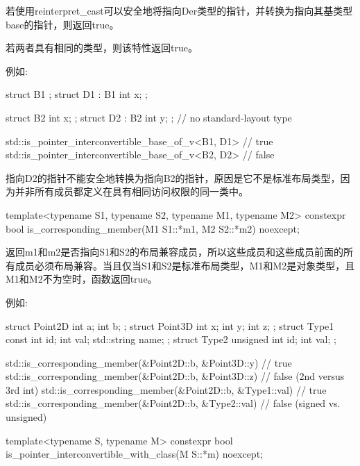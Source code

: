 
若使用reinterpret\_cast可以安全地将指向Der类型的指针，并转换为指向其基类型base的指针，则返回true。

若两者具有相同的类型，则该特性返回true。

例如:

\begin{cpp}
struct B1 { };
struct D1 : B1 { int x; };

struct B2 { int x; };
struct D2 : B2 { int y; }; // no standard-layout type

std::is_pointer_interconvertible_base_of_v<B1, D1> // true
std::is_pointer_interconvertible_base_of_v<B2, D2> // false
\end{cpp}

指向D2的指针不能安全地转换为指向B2的指针，原因是它不是标准布局类型，因为并非所有成员都定义在具有相同访问权限的同一类中。


\begin{cpp}
template<typename S1, typename S2, typename M1, typename M2>
constexpr bool is_corresponding_member(M1 S1::*m1, M2 S2::*m2) noexcept;
\end{cpp}

返回m1和m2是否指向S1和S2的布局兼容成员，所以这些成员和这些成员前面的所有成员必须布局兼容。当且仅当S1和S2是标准布局类型，M1和M2是对象类型，且M1和M2不为空时，函数返回true。

例如:

\begin{cpp}
struct Point2D { int a; int b; };
struct Point3D { int x; int y; int z; };
struct Type1 { const int id; int val; std::string name; };
struct Type2 { unsigned int id; int val; };

std::is_corresponding_member(&Point2D::b, &Point3D::y) // true
std::is_corresponding_member(&Point2D::b, &Point3D::z) // false (2nd versus 3rd int)
std::is_corresponding_member(&Point2D::b, &Type1::val) // true
std::is_corresponding_member(&Point2D::b, &Type2::val) // false (signed vs. unsigned)
\end{cpp}


\begin{cpp}
template<typename S, typename M>
constexpr bool is_pointer_interconvertible_with_class(M S::*m) noexcept;
\end{cpp}

